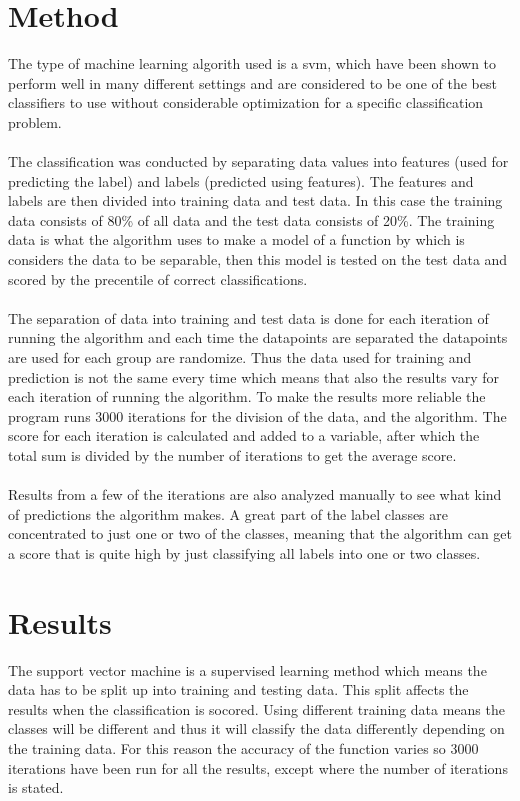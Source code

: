 \documentclass[11pt]{article}
\begin{document}
\section{Method}
The type of machine learning algorith used is a \gls{svm}, which have been shown to perform well in many different settings and are considered to be one of the best classifiers to use without considerable optimization for a specific classification problem.\\
\\
The classification was conducted by separating data values into features (used for predicting the label) and labels (predicted using features). The features and labels are then divided into training data and test data. In this case the training data consists of 80\% of all data and the test data consists of 20\%. The training data is what the algorithm uses to make a model of a function by which is considers the data to be separable, then this model is tested on the test data and scored by the precentile of correct  classifications.\\
\\
The separation of data into training and test data is done for each iteration of running the algorithm and each time the datapoints are separated the datapoints are used for each group are randomize. Thus the data used for training and prediction is not the same every time which means that also the results vary for each iteration of running the algorithm. To make the results more reliable the program runs 3000 iterations for the division of the data, and the algorithm. The score for each iteration is calculated and added to a variable, after which the total sum is divided by the number of iterations to get the average score.\\
\\
Results from a few of the iterations are also analyzed manually to see what kind of predictions the algorithm makes. A great part of the label classes are concentrated to just one or two of the classes, meaning that the algorithm can get a score that is quite high by just classifying all labels into one or two classes.

\section{Results}
The support vector machine is a supervised learning method which means the data has to be split up into training and testing data. This split affects the results when the classification is socored. Using different training data means the classes will be different and thus it will classify the data differently depending on the training data. For this reason the accuracy of the function varies so 3000 iterations have been run for all the results, except where the number of iterations is stated.
\end{document}
